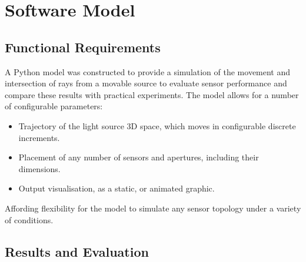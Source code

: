 \section{Software Model}

\subsection{Functional Requirements}

A Python model was constructed to provide a simulation of the movement and intersection of rays from a movable source to evaluate sensor performance and compare these results with practical experiments.
The model allows for a number of configurable parameters:
\begin{itemize}
    \item Trajectory of the light source 3D space, which moves in configurable discrete increments.
    \item Placement of any number of sensors and apertures, including their dimensions.
    \item Output visualisation, as a static, or animated graphic.
\end{itemize}
Affording flexibility for the model to simulate any sensor topology under a variety of conditions.



\subsection{Results and Evaluation}